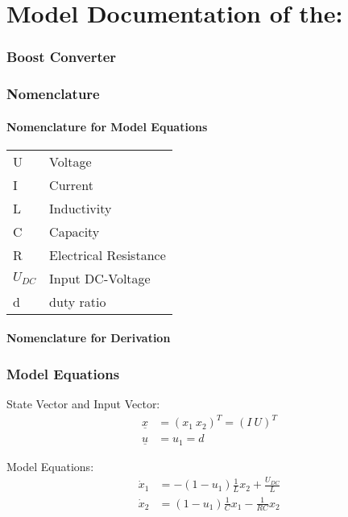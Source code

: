 \documentclass[10pt,a4paper]{article}
\begin{document}
	\part*{Model Documentation of the:}
	\section*{Boost Converter} %
	
	
	\section{Nomenclature} %
	\subsection{Nomenclature for Model Equations} %
	
	\begin{tabular}{ll}
		U & Voltage \\
		I & Current \\
		L & Inductivity \\
		C & Capacity \\
		R & Electrical Resistance \\
		$U_{DC}$ & Input DC-Voltage \\
		d & duty ratio		
	\end{tabular}
	
	\subsection{Nomenclature for Derivation} %
	
	
	\section{Model Equations} %
	
	State Vector and Input Vector:
	\begin{align*}
		\underline{x} &= (x_1 \ x_2)^T = (I \ U )^T \\
		\underline{u} &= u_1 = d
	\end{align*}
	
	\noindent Model Equations:	
	\begin{subequations}
	\begin{align}
		\dot{x}_1 &= -(1 - u_1) \frac{1}{L} x_2 + \frac{U_{DC}}{L}\\    
		\dot{x}_2 &= (1 - u_1) \frac{1}{C} x_1 - \frac{1}{RC} x_2  
	\end{align}
	\end{subequations}
\end{document}
